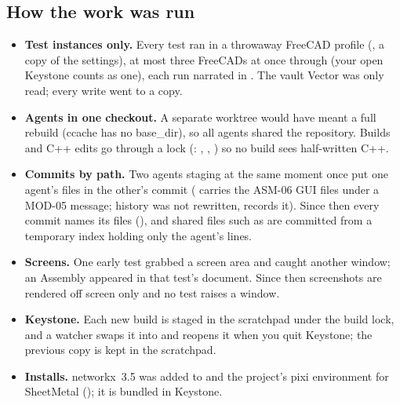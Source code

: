 \subsection{How the work was run}
\begin{itemize}
  \item \textbf{Test instances only.} Every test ran in a throwaway FreeCAD profile (, a
        copy of the settings), at most three FreeCADs at once through  (your open Keystone
        counts as one), each run narrated in . The vault Vector was only read; every
        write went to a copy.
  \item \textbf{Agents in one checkout.} A separate worktree would have meant a full rebuild (ccache has no
        base\_dir), so all agents shared the repository. Builds and C++ edits go through a lock
        (: , , ) so no build sees half-written C++.
  \item \textbf{Commits by path.} Two agents staging at the same moment once put one agent's files in the other's
        commit ( carries the ASM-06 GUI files under a MOD-05 message; history was not rewritten,
         records it). Since then every commit names its files (), and
        shared files such as  are committed from a temporary index holding only the agent's lines.
  \item \textbf{Screens.} One early test grabbed a screen area and caught another window; an Assembly appeared in
        that test's document. Since then screenshots are rendered off screen only and no test raises a window.
  \item \textbf{Keystone.} Each new build is staged in the scratchpad under the build lock, and a watcher swaps it
        into  and reopens it when you quit Keystone; the previous copy is kept in the
        scratchpad.
  \item \textbf{Installs.} networkx~3.5 was added to  and the project's pixi environment for
        SheetMetal (); it is bundled in Keystone.
\end{itemize}


